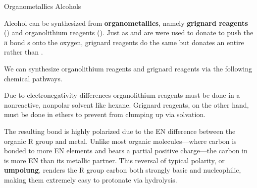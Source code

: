 \documentclass[10pt]{article}
\begin{document}
  \begin{core}[label=core:organometallics]{Organometallics \rightarrow Alcohols}
   
    Alcohol can be synthesized from \textbf{organometallics}, namely \textbf{grignard reagents} () and organolithium reagents (). Just as  and  are were used to donate  to push the π bond s onto the oxygen, grignard reagents do the same but donates an entire  rather than .

    We can synthesize organolithium reagents and grignard reagents via the following chemical pathways.



    Due to electronegativity differences organolithium reagents must be done in a nonreactive, nonpolar solvent like hexane. Grignard reagents, on the other hand, must be done in ethers to prevent  from clumping up via solvation. 


    The resulting  bond is highly polarized due to the EN difference between the organic R group and metal. Unlike most organic molecules---where carbon is bonded to more EN elements and bears a partial positive charge---the carbon in  is more EN than its metallic partner. This reversal of typical polarity, or \textbf{umpolung}, renders the R group carbon both strongly basic and nucleophilic, making them extremely easy to protonate via hydrolysis.



\end{core}
\end{document}
